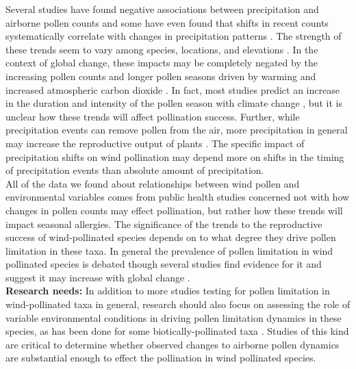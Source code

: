 \documentclass[11pt]{article}
\begin{document}
\noindent Several studies have found negative associations between precipitation and airborne pollen counts \citep{Grewling:2014aa,Gross2019,Pace:2018aa} and some have even found that shifts in recent counts systematically correlate with changes in precipitation patterns \citep{Zhang:2015, Bruffaerts:2018aa}. The strength of these trends seem to vary among species, locations, and elevations \citep{Knaap:2010aa,Pace:2018aa}. In the context of global change, these impacts may be completely negated by the increasing pollen counts and longer pollen seasons driven by warming \citep{Gross2019} and increased atmospheric carbon dioxide \citep{Ziska:2000aa}. In fact, most studies predict an increase in the duration and intensity of the pollen season with climate change \citep{Ziello:2012aa,Zhang:2015}, but it is unclear how these trends will affect pollination success. Further, while precipitation events can remove pollen from the air, more precipitation in general may increase the reproductive output of plants \citep{Fernandez-Martinez:2012aa}. The specific impact of precipitation shifts on wind pollination may depend more on shifts in the timing of precipitation events than absolute amount of precipitation. \\ %

\noindent All of the data we found about relationships between wind pollen and environmental variables comes from public health studies concerned not with how changes in pollen counts may effect pollination, but rather how these trends will impact seasonal allergies. The significance of the trends to the reproductive success of wind-pollinated species depends on to what degree they drive pollen limitation in these taxa. In general the prevalence of pollen limitation in wind pollinated species is debated \citep{Friedman:2009aa} though several studies find evidence for it \citep{Koenig:2012aa} and suggest it may increase with global change \citep{Koenig:2003aa,Knapp:2001aa}.\\

\noindent \textbf{Research needs:} In addition to more studies testing for pollen limitation in wind-pollinated taxa in general, research should also focus on assessing the role of variable environmental conditions in driving pollen limitation dynamics in these species, as has been done for some biotically-pollinated taxa \citep{Totland:1999aa}. Studies of this kind are critical to determine whether observed changes to airborne pollen dynamics are substantial enough to effect the pollination in wind pollinated species.\\
\end{document}
